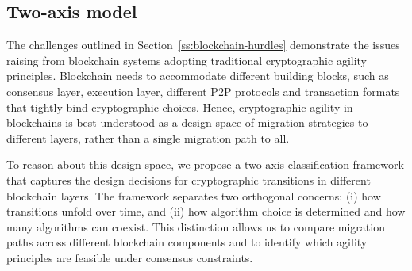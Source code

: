 





\subsection{Two-axis model}

The challenges outlined in Section~\ref{ss:blockchain-hurdles} demonstrate the issues raising from blockchain systems adopting traditional cryptographic agility principles.
Blockchain needs to accommodate different building blocks, such as consensus layer, execution layer, different P2P protocols and transaction formats that tightly bind cryptographic choices. 
Hence, cryptographic agility in blockchains is best understood as a design space of migration strategies to different layers, rather than a single migration path to all.

To reason about this design space, we propose a two-axis classification framework that captures the design decisions for cryptographic transitions in different blockchain layers. 
The framework separates two orthogonal concerns: (i) how transitions unfold over time, and (ii) how algorithm choice is determined and how many algorithms can coexist.
This distinction allows us to compare migration paths across different blockchain components and to identify which agility principles are feasible under consensus constraints.

